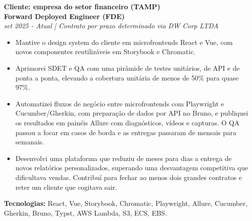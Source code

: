 \documentclass[10pt,a4paper]{altacv}
\begin{document}
\textbf{Cliente: empresa do setor financeiro (TAMP)}\\
\textbf{Forward Deployed Engineer (FDE)}\\
\textit{set 2025 - Atual | Contrato por prazo determinado via DW Corp LTDA}
\begin{itemize}
\setlength{\itemindent}{0.5em}
\item[--] Mantive o design system do cliente em microfrontends React e Vue, com novos componentes reutilizáveis em Storybook e Chromatic.
\item[--] Aprimorei SDET e QA com uma pirâmide de testes unitários, de API e de ponta a ponta, elevando a cobertura unitária de menos de 50\% para quase 97\%.
\item[--] Automatizei fluxos de negócio entre microfrontends com Playwright e Cucumber/Gherkin, com preparação de dados por API no Bruno, e publiquei os resultados em painéis Allure com diagnósticos, vídeos e capturas. O QA passou a focar em casos de borda e as entregas passaram de mensais para semanais.
\item[--] Desenvolvi uma plataforma que reduziu de meses para dias a entrega de novos relatórios personalizados, superando uma desvantagem competitiva que dificultava vendas. Contribuí para fechar ao menos dois grandes contratos e reter um cliente que cogitava sair.
\end{itemize}
\textbf{Tecnologias:} React, Vue, Storybook, Chromatic, Playwright, Allure, Cucumber, Gherkin, Bruno, Typst, AWS Lambda, S3, ECS, EBS.

\newpage
{}
\end{document}
